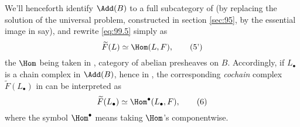 We'll henceforth identify $\Add(B)$ to a full subcategory
of \Bhatab{} (by replacing the solution of the universal problem,
constructed in section \ref{sec:95}, by the essential image in
\Bhatab{} say), and rewrite \eqref{eq:99.5} simply as
\begin{equation}
  \label{eq:99.5prime}
  \widetilde F(L)\simeq \Hom(L,F),\tag{5'}
\end{equation}
the $\Hom$ being taken in \Bhatab, category of abelian presheaves on
$B$. Accordingly, if $L_\bullet$ is a chain complex in $\Add(B)$,
hence in \Bhatab, the corresponding \emph{cochain} complex $\widetilde
F(L_\bullet)$ in \Ab{} can be interpreted as
\begin{equation}
  \label{eq:99.6}
  \widetilde F(L_\bullet) \simeq \Hom^\bullet(L_\bullet,F),\tag{6}
\end{equation}
where the symbol $\Hom^\bullet$ means taking $\Hom$'s componentwise.


